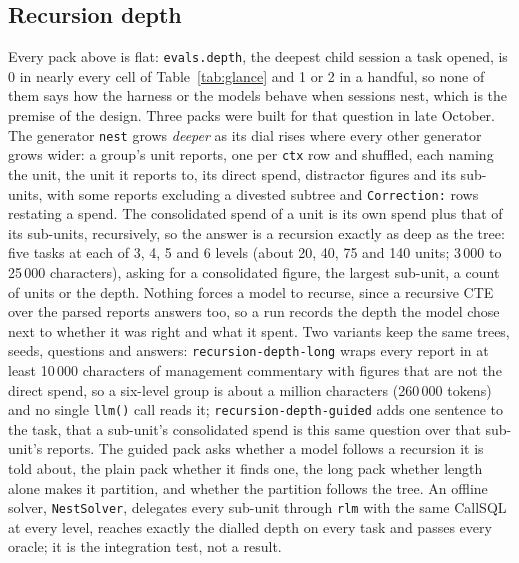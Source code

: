 \documentclass[11pt,a4paper]{article}
\newcommand{\callsql}{CallSQL}
\newcommand{\code}[1]{\texttt{#1}}
\begin{document}
\FloatBarrier
\subsection{Recursion depth}
\label{sec:recursion}

Every pack above is flat: \code{evals.depth}, the deepest child session a
task opened, is 0 in nearly every cell of Table~\ref{tab:glance} and 1 or 2
in a handful, so none of them says how the harness or the models behave
when sessions nest, which is the premise of the design. Three packs were
built for that question in late October. The generator \code{nest} grows
\emph{deeper} as its dial rises where every other generator grows wider: a
group's unit reports, one per \code{ctx} row and shuffled, each naming the
unit, the unit it reports to, its direct spend, distractor figures and its
sub-units, with some reports excluding a divested subtree and
\code{Correction:} rows restating a spend. The consolidated spend of a unit
is its own spend plus that of its sub-units, recursively, so the answer is
a recursion exactly as deep as the tree: five tasks at each of 3, 4, 5 and
6 levels (about 20, 40, 75 and 140 units; 3\,000 to 25\,000 characters),
asking for a consolidated figure, the largest sub-unit, a count of units
or the depth. Nothing forces a model to recurse, since a recursive CTE over
the parsed reports answers too, so a run records the depth the model chose
next to whether it was right and what it spent. Two variants keep the same
trees, seeds, questions and answers: \code{recursion-depth-long} wraps
every report in at least 10\,000 characters of management commentary with
figures that are not the direct spend, so a six-level group is about a
million characters (260\,000 tokens) and no single \code{llm()} call reads
it; \code{recursion-depth-guided} adds one sentence to the task, that a
sub-unit's consolidated spend is this same question over that sub-unit's
reports. The guided pack asks whether a model follows a recursion it is
told about, the plain pack whether it finds one, the long pack whether
length alone makes it partition, and whether the partition follows the
tree. An offline solver, \code{NestSolver}, delegates every sub-unit
through \code{rlm} with the same \callsql{} at every level, reaches exactly
the dialled depth on every task and passes every oracle; it is the
integration test, not a result.
\end{document}
